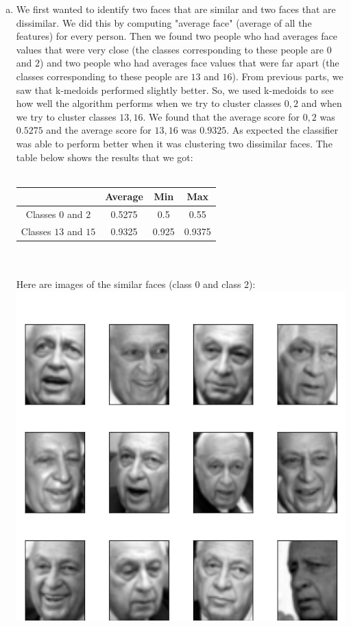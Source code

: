 \documentclass[11pt]{article}
\begin{document}
\begin{enumerate}[1]
\begin{enumerate}[(a)]
\item We first wanted to identify two faces that are similar and two faces that are dissimilar. We did this by computing "average face" (average of all the features) for every person. Then we found two people who had averages face values that were very close (the classes corresponding to these people are $0$ and $2$) and two people who had averages face values that were far apart (the classes corresponding to these people are $13$ and $16$). From previous parts, we saw that k-medoids performed slightly better. So, we used k-medoids to see how well the algorithm performs when we try to cluster classes $0,2$ and when we try to cluster classes $13,16$. We found that the average score for $0,2$ was $0.5275$ and the average score for $13, 16$ was $0.9325$. As expected the classifier was able to perform better when it was clustering two dissimilar faces.  The table below shows the results that we got: \\ \\
 \begin{tabular}{| c | c | c | c |}
  \hline		
   & Average & Min & Max \\
  \hline
  Classes $0$ and $2$ & 0.5275 & 0.5 & 0.55 \\
  Classes $13$ and $15$ & 0.9325 & 0.925 & 0.9375   \\
  \hline
\end{tabular}\\ \\
\newpage
Here are images of the similar faces (class $0$ and class $2$): \\
\includegraphics[scale=0.35]{plot0.png} \hspace*{5em}

\end{enumerate}
\end{enumerate}
\end{document}
